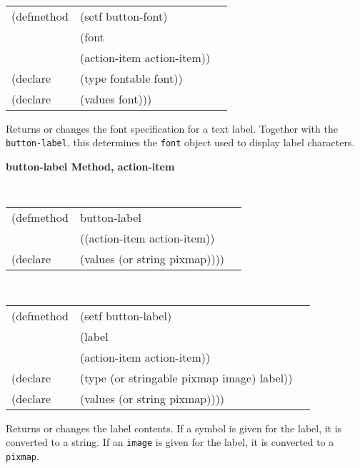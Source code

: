 \begin{flushright} \parbox[t]{6.125in}{
\tt
\begin{tabular}{lll}
\raggedright
(defmethod & (setf button-font) & \\
         & (font \\
         & (action-item  action-item)) \\
(declare &(type fontable  font))\\
(declare & (values font)))
\end{tabular}
\rm}
\end{flushright}

\begin{flushright} \parbox[t]{6.125in}{
Returns or changes the font specification for a text label. Together
with the {\tt button-label}, this determines the {\tt font}
object used to display label characters.
}
\end{flushright}




{\samepage  
{\large {\bf button-label \hfill Method, action-item}}
\begin{flushright} \parbox[t]{6.125in}{
\tt
\begin{tabular}{lll}
\raggedright
(defmethod & button-label & \\
& ((action-item  action-item)) \\
(declare & (values (or string pixmap))))
\end{tabular}
\rm

}\end{flushright}}

\begin{flushright} \parbox[t]{6.125in}{
\tt
\begin{tabular}{lll}
\raggedright
(defmethod & (setf button-label) & \\
         & (label \\
         & (action-item  action-item)) \\
(declare &(type (or stringable pixmap image)  label))\\
(declare & (values (or string pixmap))))
\end{tabular}
\rm}
\end{flushright}

\begin{flushright} \parbox[t]{6.125in}{
Returns or changes the label contents. If a symbol is given for the label, it is
converted to a string. If an {\tt image} is given for the label, it is converted
to a {\tt pixmap}.} \end{flushright}

